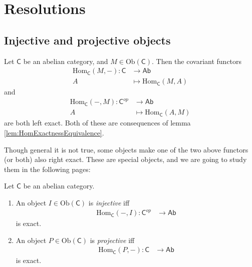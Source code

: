 \documentclass[../Main]{subfiles}
\begin{document}
\section{Resolutions}
\subsection{Injective and projective objects}
\begin{rem}[]
	Let $\mathsf{C}$ be an abelian category, and $M \in \mathrm{Ob} \left(\mathsf{C}\right)$.
	Then the covariant functors
	\begin{align}
		\mathrm{Hom}_{\mathsf{C}} \left( M, - \right)\colon \mathsf{C} &\longrightarrow \mathsf{Ab} \\
		A &\longmapsto \mathrm{Hom}_{\mathsf{C}} \left( M, A \right) \nonumber
	\end{align} 
	and
	\begin{align}
		\mathrm{Hom}_{\mathsf{C}} \left( - ,M \right)\colon \mathsf{C}^{op} &\longrightarrow \mathsf{Ab} \\
		A &\longmapsto \mathrm{Hom}_{\mathsf{C}} \left( A, M \right) \nonumber
	\end{align} 
	are both left exact.
	Both of these are consequences of lemma \ref{lem:HomExactnessEquivalence}.
\end{rem}

Though general it is not true, 
some objects make one of the two above functors (or both)
also right exact.
These are special objects, and we are going to study
them in the following pages:

\begin{defn}
	Let $\mathsf{C}$ be an abelian category.
	\begin{enumerate}
		\item An object $I \in \mathrm{Ob} \left(\mathsf{C}\right)$ is {\em injective}
			iff
			\begin{align}
				\mathrm{Hom}_{\mathsf{C}} \left( -, I \right)\colon \mathsf{C}^{op} &\longrightarrow \mathsf{Ab}
			\end{align} 
			is exact.
		\item An object $P \in \mathrm{Ob} \left(\mathsf{C}\right)$ is {\em projective}
			iff
			\begin{align}
				\mathrm{Hom}_{\mathsf{C}} \left( P, - \right) \colon \mathsf{C} &\longrightarrow \mathsf{Ab}
			\end{align} 
			is exact.
	\end{enumerate}
\end{defn}
\end{document}

